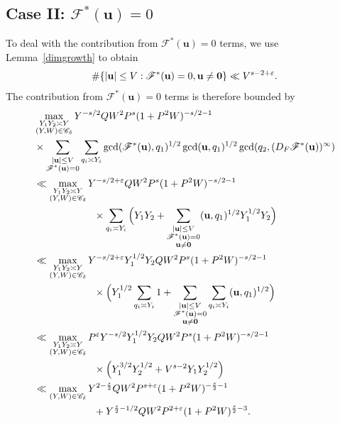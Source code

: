 \documentclass[letterpaper,11pt]{amsart}
\numberwithin{equation}{section}
\theoremstyle{definition}
\numberwithin{equation}{section}
\newcommand{\uu}{\mathbf{u}}
\def\scrF{{\mathcal F}}
\def\vecnull{{\text{\boldmath$0$}}}
\newcommand{\ve}{\varepsilon}
\begin{document}
  \subsection{Case II: $\mathcal F^*(\uu)=0$}
To deal with the contribution from $\scrF^*(\uu)=0$ terms, we use Lemma~\ref{dimgrowth} to obtain
$$\#\{|\uu|\leq V:\scrF^*(\uu)=0,\uu\neq \vecnull\} \ll V^{s-2+\varepsilon}.$$
The contribution from $\mathcal F^*(\uu)=0$ terms is therefore bounded by 
\begin{align}\nonumber
&\max_{\substack{Y_1Y_2\asymp Y\\ (Y, W)\in \mathcal C_\delta}}Y^{-s/2}QW^2P^s(1+P^2W)^{-s/2-1}\\\nonumber
&\times\sum_{\substack{|\uu|\leq V\\ \scrF^*(\uu)= 0}}\sum_{q_i\asymp Y_i}\gcd(\scrF^*(\uu),q_1)^{1/2}\gcd(\uu,q_1)^{1/2}\gcd(q_2,(D_F\scrF^*(\uu))^\infty)\\
\nonumber
&\ll \max_{\substack{Y_1Y_2\asymp Y\\ (Y, W)\in \mathcal C_\delta}} 
Y^{-s/2+\ve}QW^2P^{s}(1+P^2W)^{-s/2-1}\\\nonumber
&\quad\quad \quad \quad\quad \quad \times\sum_{q_i\asymp Y_i}\Big(Y_1Y_2+\sum_{\substack{|\uu|\leq V\\ \scrF^*(\uu)= 0\\ \uu\neq\vecnull}}(\uu,q_1)^{1/2}Y_1^{1/2} Y_2\Big)\\
\nonumber
&\ll \max_{\substack{Y_1Y_2\asymp Y\\ (Y, W)\in \mathcal C_\delta}} Y^{-s/2+\ve}Y_1^{1/2}Y_2 QW^2 P^{s}(1+P^2W)^{-s/2-1}\\ \nonumber &\quad\quad \quad \quad\quad \quad \times  \Big(Y_1^{1/2}\sum_{q_i \asymp Y_i}1+\sum_{\substack{|\uu|\leq V\\ \scrF^*(\uu)= 0\\ \uu\neq\vecnull}}\sum_{q_i\asymp Y_i}(\uu,q_1)^{1/2}\Big)\\
\nonumber
&\ll \max_{\substack{Y_1Y_2\asymp Y\\ (Y, W)\in \mathcal C_\delta}} P^\ve Y^{-s/2}Y_1^{1/2}Y_2QW^2 P^s(1+P^2W)^{-s/2-1}\\ \nonumber &\quad\quad \quad \quad\quad \quad \times\Big(Y_1^{3/2}Y_2^{1/2}+V^{s-2}Y_1Y_2^{1/2}\Big)\\
&\ll \nonumber \max_{\substack{(Y, W)\in \mathcal C_\delta}}Y^{2-\frac{s}{2}}Q W^2 P^{s+\ve}(1+P^2W)^{-\frac{s}{2}-1}\\ &\quad\quad \quad \quad\quad \quad + Y^{\frac{s}{2}-1/2}QW^2P^{2+\ve}(1+P^2W)^{\frac{s}{2}-3}\label{E12bound}.
\end{align}
\end{document}
